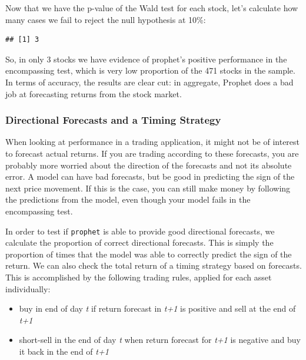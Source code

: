\documentclass[11pt,]{book}
\newenvironment{Shaded}{\begin{snugshade}}{\end{snugshade}}
\newcommand{\KeywordTok}[1]{\textcolor[rgb]{0.27,0.27,0.27}{\textbf{#1}}}
\newcommand{\FloatTok}[1]{\textcolor[rgb]{0.06,0.06,0.06}{#1}}
\newcommand{\StringTok}[1]{\textcolor[rgb]{0.5,0.5,0.5}{#1}}
\newcommand{\OperatorTok}[1]{\textcolor[rgb]{0.81,0.36,0.00}{\textbf{#1}}}
\newcommand{\NormalTok}[1]{#1}
\providecommand{\tightlist}{%
  \setlength{\itemsep}{0pt}\setlength{\parskip}{0pt}}
\begin{document}
Now that we have the p-value of the Wald test for each stock, let's
calculate how many cases we fail to reject the null hypothesis at 10\%:

\begin{Shaded}
\end{Shaded}

\begin{verbatim}
## [1] 3
\end{verbatim}

So, in only 3 stocks we have evidence of prophet's positive performance
in the encompassing test, which is very low proportion of the 471 stocks
in the sample. In terms of accuracy, the results are clear cut: in
aggregate, Prophet does a bad job at forecasting returns from the stock
market.

\subsubsection{Directional Forecasts and a Timing
Strategy}\label{directional-forecasts-and-a-timing-strategy}

When looking at performance in a trading application, it might not be of
interest to forecast actual returns. If you are trading according to
these forecasts, you are probably more worried about the direction of
the forecasts and not its absolute error. A model can have bad
forecasts, but be good in predicting the sign of the next price
movement. If this is the case, you can still make money by following the
predictions from the model, even though your model fails in the
encompassing test.

In order to test if \texttt{prophet} is able to provide good directional
forecasts, we calculate the proportion of correct directional forecasts.
This is simply the proportion of times that the model was able to
correctly predict the sign of the return. We can also check the total
return of a timing strategy based on forecasts. This is accomplished by
the following trading rules, applied for each asset individually:

\begin{itemize}
\tightlist
\item
  buy in end of day \emph{t} if return forecast in \emph{t+1} is
  positive and sell at the end of \emph{t+1}
\item
  short-sell in the end of day \emph{t} when return forecast for
  \emph{t+1} is negative and buy it back in the end of \emph{t+1}
\end{itemize}
\end{document}
